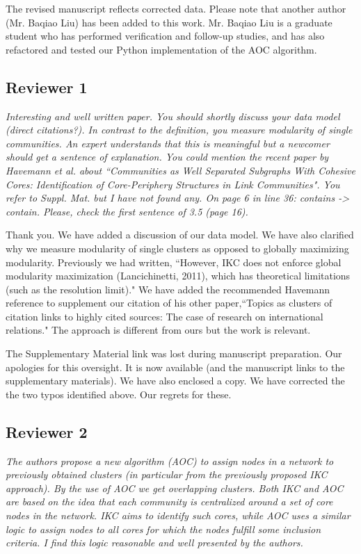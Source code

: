 \documentclass[11pt, oneside]{article}   	%
\begin{document}
\noindent The revised manuscript reflects corrected data. Please note that another author (Mr. Baqiao Liu) has been added to this work. Mr. Baqiao Liu is a graduate student who has performed verification and follow-up studies, and 
has also refactored and tested our Python implementation of the AOC algorithm.


\subsection*{Reviewer 1} \emph{Interesting and well written paper. You should shortly discuss your data model (direct citations?). In contrast to the definition, you measure modularity of single communities. An expert understands that this is meaningful but a newcomer should get a sentence of explanation.  You could mention the recent paper by Havemann et al. about ``Communities as Well Separated Subgraphs With Cohesive Cores: Identification of Core-Periphery Structures in Link Communities". You refer to Suppl. Mat. but I have not found any. On page 6 in line 36: contains -> contain. Please, check the first sentence of 3.5 (page 16).}

\vspace{2 mm}
Thank you. We have added a discussion of our data model. We have also clarified why we measure modularity of single clusters as opposed to globally maximizing modularity. Previously we had written, ``However, 
IKC does not enforce global modularity maximization (Lancichinetti, 2011), which has theoretical limitations (such as the resolution limit)." We have added the recommended  Havemann reference to supplement 
our citation of his other paper,``Topics as clusters of citation links to highly cited sources: The case of research on international relations." The approach is different from ours but the work is relevant.

The Supplementary Material link was lost during manuscript preparation. Our apologies for this oversight. It is now available (and the manuscript links to the supplementary materials). We have also enclosed a copy. We have corrected the the two typos identified
above. Our regrets for these.

\clearpage

\subsection*{Reviewer 2} \emph{The authors propose a new algorithm (AOC) to assign nodes in a network to previously obtained clusters (in particular from the previously proposed IKC approach). By the use of AOC we get overlapping clusters. Both IKC and AOC are based on the idea that each community is centralized around a set of core nodes in the network. IKC aims to identify such cores, while AOC uses a similar logic to assign nodes to all cores for which the nodes fulfill some inclusion criteria. I find this logic reasonable and well presented by the authors.} 
\end{document}
